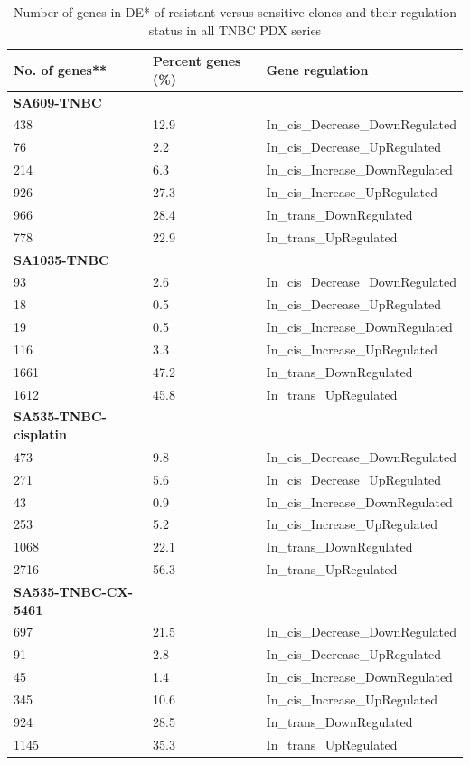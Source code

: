 
 \begin{table}[htbp]
   \centering
   \caption{Number of genes in DE* of resistant versus sensitive clones and their regulation status in all TNBC PDX series}
     \begin{tabular}{|l|l|l|}
     \hline
     \multicolumn{1}{|l|}{\textbf{No. of genes**}} & \multicolumn{1}{|l|}{\textbf{Percent genes (\%)}} & \textbf{Gene regulation} \\
     \hline
     \multicolumn{1}{|l|}{\textbf{SA609-TNBC}} &   &  \\
     438 & 12.9 & In\_cis\_Decrease\_DownRegulated \\
     76 & 2.2 & In\_cis\_Decrease\_UpRegulated \\
     214 & 6.3 & In\_cis\_Increase\_DownRegulated \\
     926 & 27.3 & In\_cis\_Increase\_UpRegulated \\
     966 & 28.4 & In\_trans\_DownRegulated \\
     778 & 22.9 & In\_trans\_UpRegulated \\
     \multicolumn{1}{|l|}{\textbf{SA1035-TNBC}} &   &  \\
     93 & 2.6 & In\_cis\_Decrease\_DownRegulated \\
     18 & 0.5 & In\_cis\_Decrease\_UpRegulated \\
     19 & 0.5 & In\_cis\_Increase\_DownRegulated \\
     116 & 3.3 & In\_cis\_Increase\_UpRegulated \\
     1661 & 47.2 & In\_trans\_DownRegulated \\
     1612 & 45.8 & In\_trans\_UpRegulated \\
     \multicolumn{1}{|l|}{\textbf{SA535-TNBC-cisplatin}} &   &  \\
     473 & 9.8 & In\_cis\_Decrease\_DownRegulated \\
     271 & 5.6 & In\_cis\_Decrease\_UpRegulated \\
     43 & 0.9 & In\_cis\_Increase\_DownRegulated \\
     253 & 5.2 & In\_cis\_Increase\_UpRegulated \\
     1068 & 22.1 & In\_trans\_DownRegulated \\
     2716 & 56.3 & In\_trans\_UpRegulated \\
     \multicolumn{1}{|l|}{\textbf{SA535-TNBC-CX-5461}} &   &  \\
     697 & 21.5 & In\_cis\_Decrease\_DownRegulated \\
     91 & 2.8 & In\_cis\_Decrease\_UpRegulated \\
     45 & 1.4 & In\_cis\_Increase\_DownRegulated \\
     345 & 10.6 & In\_cis\_Increase\_UpRegulated \\
     924 & 28.5 & In\_trans\_DownRegulated \\
     1145 & 35.3 & In\_trans\_UpRegulated \\
     \hline
     \end{tabular}%
     

\end{table}
